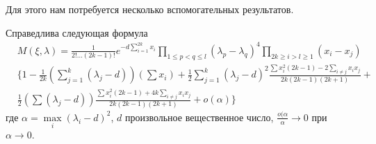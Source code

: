 Для этого нам потребуется несколько вспомогательных результатов.
\begin{lem}
Справедлива следующая формула
\begin{equation}
\begin{split}
&M(\xi, \lambda) =   \frac{1}{2! … (2k-1)!} e^{-d \sum\limits_{i=1}^{2k} x_i} \prod \limits_{1 \leq p < q \leq l} (\lambda_p - \lambda_q)^4 \prod \limits_{2k \geq i > l \geq 1} (x_i - x_j) \\
&\{ 1 - \frac{1}{2k} \left(\sum \limits_{j=1}^k( \lambda_j- d)\right) \left(\sum x_i\right) 
+ \frac{1}{2}\sum \limits_{j=1}^{k} (\lambda_j - d)^2 \frac{\sum x_i^2 (2k-1) - 2\sum \limits_{i\neq j} x_i x_j}{2k(2k-1)(2k+1)} + \\
&\frac{1}{2} \left( \sum (\lambda_j - d) \right) 
\frac{\sum x_i ^ 2 (2k-1) + 4k \sum\limits_{i \neq j} x_i x_j}{2k (2k-1)(2k+1)} + o(\alpha)\}
\end{split}
\end{equation}
где $\alpha = \max\limits_{i}(\lambda_i - d )^2$, $d$ произвольное вещественное число, $\frac{o(\alpha}{\alpha} \rightarrow 0$ при $\alpha \rightarrow 0$.
\end{lem}
